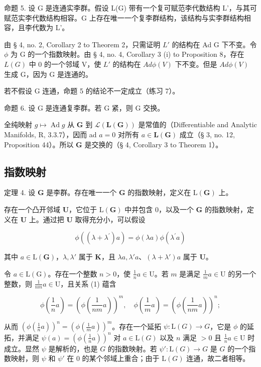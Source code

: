 命题 5. 设 G 是连通实李群。假设 L(G) 带有一个复可赋范李代数结构 L'，与其可赋范实李代数结构相容。G 上存在唯一一个复李群结构，该结构与实李群结构相容，且李代数为 L'。

由 § 4, no. 2, Corollary 2 to Theorem 2，只需证明 \(L'\) 的结构在 Ad G 下不变。令 \(\phi\) 为 G 的一个指数映射。由 § 4, no. 4, Corollary 3 (i) to Proposition 8，存在 \(L(G)\) 中 0 的一个邻域 V，使 \(L'\) 的结构在 \(Ad\phi(V)\) 下不变。但是 \(Ad\phi(V)\) 生成 G，因为 G 是连通的。

若不假设 G 连通，命题 5 的结论不一定成立（练习 7）。

命题 6. 设 G 是连通复李群。若 G 紧，则 G 交换。

全纯映射 \(g \mapsto \operatorname{Ad} g\) 从 \(\mathbf{G}\) 到 \(\mathcal{L}(\mathbf{L}(\mathbf{G}))\) 是常值的（Differentiable and Analytic Manifolds, R, 3.3.7），因而 ad \(a = 0\) 对所有 \(a \in \mathbf{L}(\mathbf{G})\) 成立（§ 3, no. 12, Proposition 44）。所以 \(\mathbf{G}\) 是交换的（§ 4, Corollary 3 to Theorem 1）。

\subsection{指数映射}

定理 4. 设 \(\mathbf{G}\) 是李群。存在唯一一个 \(\mathbf{G}\) 的指数映射，定义在 \(\mathrm{L}(\mathbf{G})\) 上。

存在一个凸开邻域 \(\mathbf{U}\)，它位于 \(\mathrm{L}(\mathbf{G})\) 中并包含 0，以及一个 \(\mathbf{G}\) 的指数映射，定义在 \(\mathbf{U}\) 上。通过把 \(\mathbf{U}\) 取得充分小，可以假设

\[
\phi ((\lambda + \lambda^ {\prime}) a) = \phi (\lambda a) \phi (\lambda^ {\prime} a)\tag{1}
\]

其中 \(a \in \mathrm{L}(\mathbf{G})\)，\(\lambda, \lambda'\) 属于 \(\mathbf{K}\)，且 \(\lambda a, \lambda'a\)、\((\lambda + \lambda')a\) 属于 \(\mathbf{U}\)。

令 \(a \in \mathrm{L}(\mathrm{G})\)。存在一个整数 \(n > 0\)，使 \(\frac{1}{n} a \in \mathrm{U}\)。若 \(m\) 是满足 \(\frac{1}{m} a \in \mathrm{U}\) 的另一个整数，则 \(\frac{1}{nm} a \in \mathrm{U}\)，且关系 (1) 蕴含

\[
\phi \left(\frac {1}{n} a\right) = \left(\phi \left(\frac {1}{n m} a\right)\right) ^ {m}, \quad \phi \left(\frac {1}{m} a\right) = \left(\phi \left(\frac {1}{n m} a\right)\right) ^ {n};
\]

从而 \(\left(\phi\left(\frac{1}{n}a\right)\right)^n = \left(\phi\left(\frac{1}{m}a\right)\right)^m\)。存在一个延拓 \(\psi: \mathrm{L}(G) \to G\)，它是 \(\phi\) 的延拓，并满足 \(\psi(a) = \left(\phi\left(\frac{1}{n}a\right)\right)^n\) 对 \(a \in \mathrm{L}(G)\) 以及 \(n\) 满足 \(>0\) 且 \(\frac{1}{n}a \in \mathrm{U}\) 时成立。显然 \(\psi\) 是解析的，也是 \(G\) 的指数映射。若 \(\psi': \mathrm{L}(G) \to G\) 是 \(G\) 的一个指数映射，则 \(\psi\) 和 \(\psi'\) 在 0 的某个邻域上重合；由于 \(\mathrm{L}(G)\) 连通，故二者相等。

